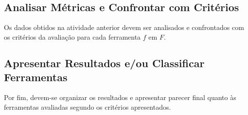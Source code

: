 \subsection{Analisar Métricas e Confrontar com Critérios}

Os dados obtidos na atividade anterior devem ser analisados e confrontados com os critérios da avaliação para cada ferramenta $f$ em $F$.

\subsection{Apresentar Resultados e/ou Classificar Ferramentas}

Por fim, devem-se organizar os resultados e apresentar parecer final quanto às ferramentas avaliadas segundo os critérios apresentados.
